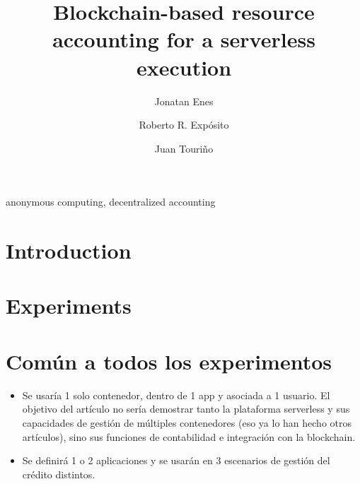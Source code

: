 \documentclass[preprint,3p]{elsarticle}
\begin{document}
\begin{frontmatter}

\title{
	Blockchain-based resource accounting for a serverless execution
}

\author{Jonatan Enes}
\author{Roberto R. Exp\'osito}
\author{Juan Touri\~no}

\address{Universidade da Coru\~na, CITIC, Computer Architecture Group, Campus de A Coru\~na, Spain}


\begin{abstract}

\end{abstract}

\begin{keyword}
anonymous computing, decentralized accounting
\end{keyword}

\end{frontmatter}

\linenumbers

\section{Introduction}
\label{sec:intro}

\section{Experiments}
\label{sec:experiments}

\section{Común a todos los experimentos}

\begin{itemize}
	\item Se usaría 1 solo contenedor, dentro de 1 app y asociada a 1 usuario. El objetivo del artículo no sería demostrar tanto la plataforma serverless y sus capacidades de gestión de múltiples contenedores (eso ya lo han hecho otros artículos), sino sus funciones de contabilidad e integración con la blockchain.
	
	\item Se definirá 1 o 2 aplicaciones y se usarán en 3 escenarios de gestión del crédito distintos.
\end{itemize}
\end{document}
